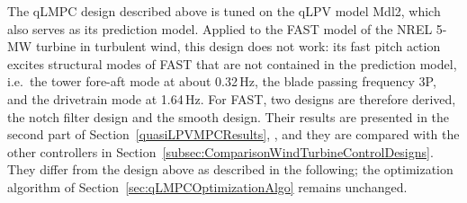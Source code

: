 

The qLMPC design described above is tuned on the qLPV model Mdl2, which also serves as its prediction model. Applied to the FAST model of the NREL 5-MW turbine in turbulent wind, this design does not work: its fast pitch action excites structural modes of FAST that are not contained in the prediction model, i.e.\ the tower fore-aft mode at about 0.32\,Hz, the blade passing frequency 3P, and the drivetrain mode at 1.64\,Hz. For FAST, two designs are therefore derived, the notch filter design and the smooth design. Their results are presented in the second part of Section~\ref{quasiLPVMPCResults}, , and they are compared with the other controllers in Section~\ref{subsec:ComparisonWindTurbineControlDesigns}. They differ from the design above as described in the following; the optimization algorithm of Section~\ref{sec:qLMPCOptimizationAlgo} remains unchanged.

